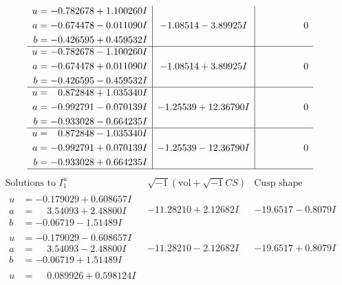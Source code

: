 \documentclass[1p]{elsarticle_modified}
\theoremstyle{definition}
\newcommand{\I}{\sqrt{-1}}
\begin{document}
$$\begin{array}{c|c|c}
\begin{aligned}
u &= -0.782678 + 1.100260 I \\
a &= -0.674478 - 0.011090 I \\
b &= -0.426595 + 0.459532 I\end{aligned}
 & -1.08514 - 3.89925 I & \phantom{-0.000000 } 0 \\ \hline\begin{aligned}
u &= -0.782678 - 1.100260 I \\
a &= -0.674478 + 0.011090 I \\
b &= -0.426595 - 0.459532 I\end{aligned}
 & -1.08514 + 3.89925 I & \phantom{-0.000000 } 0 \\ \hline\begin{aligned}
u &= \phantom{-}0.872848 + 1.035340 I \\
a &= -0.992791 - 0.070139 I \\
b &= -0.933028 - 0.664235 I\end{aligned}
 & -1.25539 + 12.36790 I & \phantom{-0.000000 } 0 \\ \hline\begin{aligned}
u &= \phantom{-}0.872848 - 1.035340 I \\
a &= -0.992791 + 0.070139 I \\
b &= -0.933028 + 0.664235 I\end{aligned}
 & -1.25539 - 12.36790 I & \phantom{-0.000000 } 0\\
 \hline 
 \end{array}$$\newpage$$\begin{array}{c|c|c}  
\text{Solutions to }I^u_{1}& \I (\text{vol} + \sqrt{-1}CS) & \text{Cusp shape}\\
 \hline 
\begin{aligned}
u &= -0.179029 + 0.608657 I \\
a &= \phantom{-}3.54093 + 2.48800 I \\
b &= -0.06719 - 1.51489 I\end{aligned}
 & -11.28210 + 2.12682 I & -19.6517 - 0.8079 I \\ \hline\begin{aligned}
u &= -0.179029 - 0.608657 I \\
a &= \phantom{-}3.54093 - 2.48800 I \\
b &= -0.06719 + 1.51489 I\end{aligned}
 & -11.28210 - 2.12682 I & -19.6517 + 0.8079 I \\ \hline\begin{aligned}
u &= \phantom{-}0.089926 + 0.598124 I \\

\end{aligned}
\end{array}$$
\end{document}
